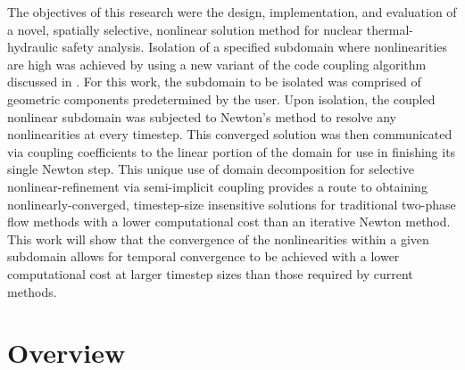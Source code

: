 The objectives of this research were the design, implementation, and evaluation of a novel, spatially selective, nonlinear solution method for nuclear thermal-hydraulic safety analysis.
Isolation of a specified subdomain where nonlinearities are high was achieved by using a new variant of the code coupling algorithm discussed in .
For this work, the subdomain to be isolated was comprised of geometric components predetermined by the user.
Upon isolation, the coupled nonlinear subdomain was subjected to Newton's method to resolve any nonlinearities at every timestep.
This converged solution was then communicated via coupling coefficients to the linear portion of the domain for use in finishing its single Newton step.
This unique use of domain decomposition for selective nonlinear-refinement via semi-implicit coupling provides a route to obtaining nonlinearly-converged, timestep-size insensitive solutions for traditional two-phase flow methods with a lower computational cost than an iterative Newton method.
This work will show that the convergence of the nonlinearities within a given subdomain allows for temporal convergence to be achieved with a lower computational cost at larger timestep sizes than those required by current methods.

\section{Overview}
\label{sect:overview}



